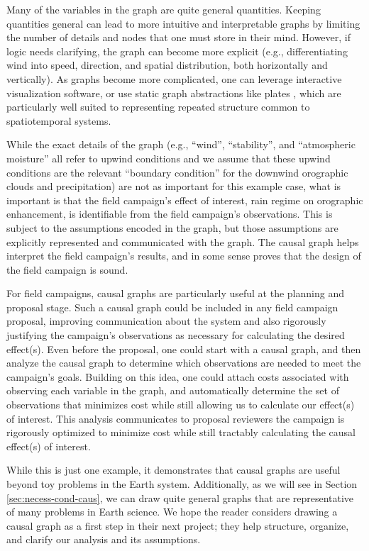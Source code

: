 \documentclass[12pt]{article}
\begin{document}
Many of the variables in the graph are quite general
quantities. Keeping quantities general can lead to more intuitive and
interpretable graphs by limiting the number of details and nodes that
one must store in their mind. However, if logic needs clarifying, the
graph can become more explicit (e.g., differentiating wind into speed,
direction, and spatial distribution, both horizontally and
vertically). As graphs become more complicated, one can leverage
interactive visualization software, or use static graph abstractions
like plates \citep{bishop2006pattern}, which are particularly well
suited to representing repeated structure common to spatiotemporal
systems.

While the exact details of the graph (e.g., ``wind'', ``stability'',
and ``atmospheric moisture'' all refer to upwind conditions and we
assume that these upwind conditions are the relevant ``boundary
condition'' for the downwind orographic clouds and precipitation) are
not as important for this example case, what is important is that the
field campaign's effect of interest, rain regime on orographic
enhancement, is identifiable from the field campaign's
observations. This is subject to the assumptions encoded in the graph,
but those assumptions are explicitly represented and communicated with
the graph. The causal graph helps interpret the field campaign's
results, and in some sense proves that the design of the field
campaign is sound.

For field campaigns, causal graphs are particularly useful at the
planning and proposal stage. Such a causal graph could be included in
any field campaign proposal, improving communication about the system
and also rigorously justifying the campaign’s observations as
necessary for calculating the desired effect(s). Even before the
proposal, one could start with a causal graph, and then analyze the
causal graph to determine which observations are needed to meet the
campaign’s goals. Building on this idea, one could attach costs
associated with observing each variable in the graph, and
automatically determine the set of observations that minimizes cost
while still allowing us to calculate our effect(s) of interest. This
analysis communicates to proposal reviewers the campaign is rigorously
optimized to minimize cost while still tractably calculating the
causal effect(s) of interest.

While this is just one example, it demonstrates that causal graphs are
useful beyond toy problems in the Earth system. Additionally, as we
will see in Section \ref{sec:necess-cond-caus}, we can draw quite
general graphs that are representative of many problems in Earth
science. We hope the reader considers drawing a causal graph as a
first step in their next project; they help structure, organize, and
clarify our analysis and its assumptions.
\end{document}
